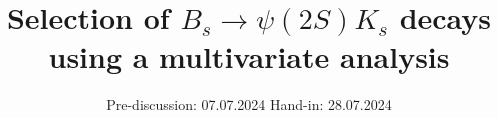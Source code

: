 

\subject{Advanced labaratory course}
\title{Selection of \texorpdfstring{$B_s \to \psi(2S)K_s$}{B_s -> Psi(2S)K_S} decays using a multivariate analysis}
\date{%
  Pre-discussion: 07.07.2024
  \hspace{3em}
  Hand-in: 28.07.2024
}
\newcommand{\signal}{$B_s \to \psi(2S)K_s$}

\usepackage{tikz}
\usepackage{tikz-feynman}
\usepackage{amsmath}




\maketitle
\thispagestyle{empty}
\tableofcontents
\newpage







\printbibliography{}


